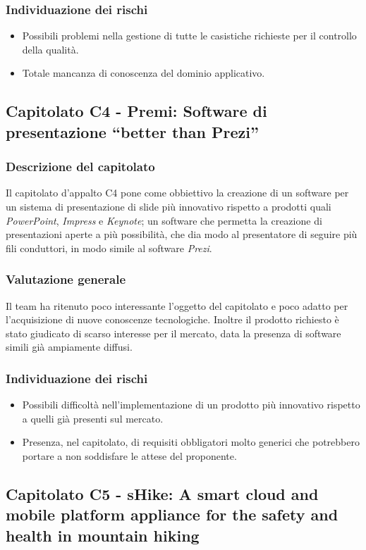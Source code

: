 		\subsubsection{Individuazione dei rischi}
			\begin{itemize}
				\item Possibili problemi nella gestione di tutte le casistiche richieste per il controllo della qualità.
				\item Totale mancanza di conoscenza del dominio applicativo.
			\end{itemize}
	\subsection{Capitolato C4 - Premi: Software di presentazione ``better than Prezi''}
		\subsubsection{Descrizione del capitolato}
			Il capitolato d'appalto C4 pone come obbiettivo la creazione di un software per un sistema di presentazione di slide più innovativo rispetto a prodotti quali \textit{PowerPoint}, \textit{Impress} e \textit{Keynote}; un software che permetta la creazione di presentazioni aperte a più possibilità, che dia modo al presentatore di seguire più fili conduttori, in modo simile al software \textit{Prezi}.
		\subsubsection{Valutazione generale}
			Il team ha ritenuto poco interessante l'oggetto del capitolato e poco adatto per l'acquisizione di nuove conoscenze tecnologiche. Inoltre il prodotto richiesto è stato giudicato di scarso interesse per il mercato, data la presenza di software simili già ampiamente diffusi.
		\subsubsection{Individuazione dei rischi}
			\begin{itemize}
				\item Possibili difficoltà nell'implementazione di un prodotto più innovativo rispetto a quelli già presenti
				sul mercato.
				\item Presenza, nel capitolato, di requisiti obbligatori molto generici che potrebbero portare a non soddisfare 
				le attese del proponente.
			\end{itemize}
	\subsection{Capitolato C5 - sHike: A smart cloud and mobile platform appliance for the safety and health in mountain hiking}
